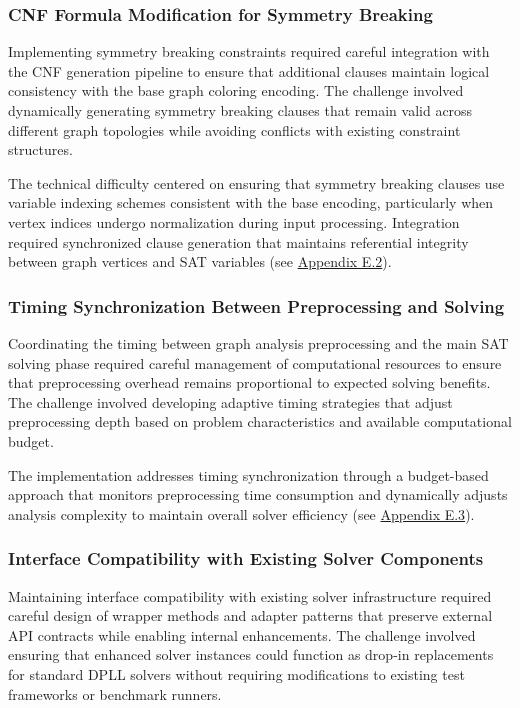 \subsubsection{CNF Formula Modification for Symmetry Breaking}

Implementing symmetry breaking constraints required careful integration with the CNF generation pipeline to ensure that additional clauses maintain logical consistency with the base graph coloring encoding. The challenge involved dynamically generating symmetry breaking clauses that remain valid across different graph topologies while avoiding conflicts with existing constraint structures.

The technical difficulty centered on ensuring that symmetry breaking clauses use variable indexing schemes consistent with the base encoding, particularly when vertex indices undergo normalization during input processing. Integration required synchronized clause generation that maintains referential integrity between graph vertices and SAT variables (see \hyperref[appendix:symmetry-integration]{Appendix E.2}).

\subsubsection{Timing Synchronization Between Preprocessing and Solving}

Coordinating the timing between graph analysis preprocessing and the main SAT solving phase required careful management of computational resources to ensure that preprocessing overhead remains proportional to expected solving benefits. The challenge involved developing adaptive timing strategies that adjust preprocessing depth based on problem characteristics and available computational budget.

The implementation addresses timing synchronization through a budget-based approach that monitors preprocessing time consumption and dynamically adjusts analysis complexity to maintain overall solver efficiency (see \hyperref[appendix:timing-coordination]{Appendix E.3}).

\subsubsection{Interface Compatibility with Existing Solver Components}

Maintaining interface compatibility with existing solver infrastructure required careful design of wrapper methods and adapter patterns that preserve external API contracts while enabling internal enhancements. The challenge involved ensuring that enhanced solver instances could function as drop-in replacements for standard DPLL solvers without requiring modifications to existing test frameworks or benchmark runners.

